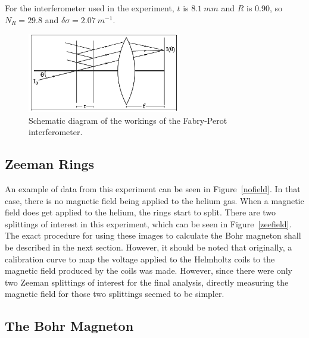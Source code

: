 \documentclass[11pt,letterpaper]{article}
\begin{document}
For the interferometer used in the experiment, $t$ is $8.1\ mm$ and $R$ is 0.90,
so $N_R = 29.8$ and $\delta\sigma = 2.07\ m^{-1}$.

\begin{figure}
    \centering
    \includegraphics[width=0.6\textwidth]{figures/Atm1image005.png}
    \caption{Schematic diagram of the workings of the Fabry-Perot
    interferometer.}
    \label{fabryperot}
\end{figure}

\subsection{Zeeman Rings}

An example of data from this experiment can be seen in Figure~\ref{nofield}. In
that case, there is no magnetic field being applied to the helium gas. When a
magnetic field does get applied to the helium, the rings start to split. There
are two splittings of interest in this experiment, which can be seen in
Figure~\ref{zeefield}. The exact procedure for using these images to calculate
the Bohr magneton shall be described in the next section. However, it should be
noted that originally, a calibration curve to map the voltage applied to the
Helmholtz coils to the magnetic field produced by the coils was made. However,
since there were only two Zeeman splittings of interest for the final analysis,
directly measuring the magnetic field for those two splittings seemed to be
simpler.

\subsection{The Bohr Magneton}
\end{document}
